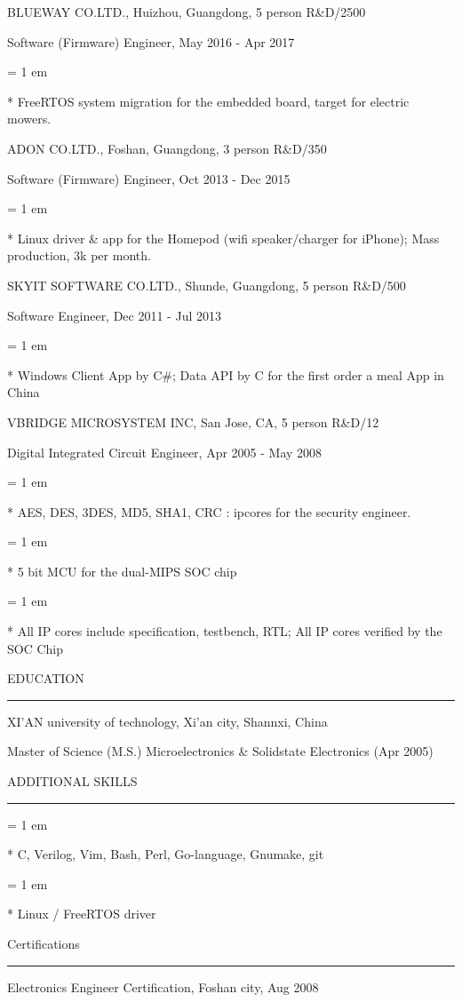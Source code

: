 { \medbreak } { \FFdd
BLUEWAY CO.LTD., Huizhou, Guangdong, 5 person R\&D/2500
}

{ \FFee
Software (Firmware) Engineer, May 2016 - Apr 2017
}
{ \parindent = 1 em \item{*} 
 FreeRTOS system migration for the embedded board, target for electric mowers.
 }

{ \medbreak } { \FFdd
ADON CO.LTD., Foshan, Guangdong, 3 person R\&D/350
}

{ \FFee
Software (Firmware) Engineer, Oct 2013 - Dec 2015
}
{ \parindent = 1 em \item{*} 
 Linux driver \& app for the Homepod (wifi speaker/charger for iPhone); Mass production, 3k per month.
 }

{ \medbreak } { \FFdd
SKYIT SOFTWARE CO.LTD., Shunde, Guangdong, 5 person R\&D/500
}

{ \FFee
Software Engineer, Dec 2011 - Jul 2013
}
{ \parindent = 1 em \item{*} 
 Windows Client App by C\#; Data API by C for the first order a meal App in China
 }

{ \medbreak } { \FFdd
VBRIDGE MICROSYSTEM INC, San Jose, CA, 5 person R\&D/12
}

{ \FFee
Digital Integrated Circuit Engineer, Apr 2005 - May 2008
}
{ \parindent = 1 em \item{*} 
 AES, DES, 3DES, MD5, SHA1, CRC : ipcores for the security engineer. 
 }
{ \parindent = 1 em \item{*} 
 5 bit MCU for the dual-MIPS SOC chip
 }
{ \parindent = 1 em \item{*} 
 All IP cores include specification, testbench, RTL; All IP cores verified by the SOC Chip
 }

{ \medbreak } { \FFdd
EDUCATION
}
{ \smallbreak } {\par\noindent\hrule} { \smallbreak }
XI'AN university of technology, Xi'an city, Shannxi, China

{ \FFee
Master of Science (M.S.) Microelectronics \& Solidstate Electronics (Apr 2005)
}

{ \medbreak } { \FFdd
ADDITIONAL SKILLS
}
{ \smallbreak } {\par\noindent\hrule} { \smallbreak }
{ \parindent = 1 em \item{*} 
 C, Verilog, Vim, Bash, Perl, Go-language, Gnumake, git
 }
{ \parindent = 1 em \item{*} 
 Linux / FreeRTOS driver
 }

{ \medbreak } { \FFdd
Certifications
}
{ \smallbreak } {\par\noindent\hrule} { \smallbreak }
Electronics Engineer Certification, Foshan city, Aug 2008

\bye
